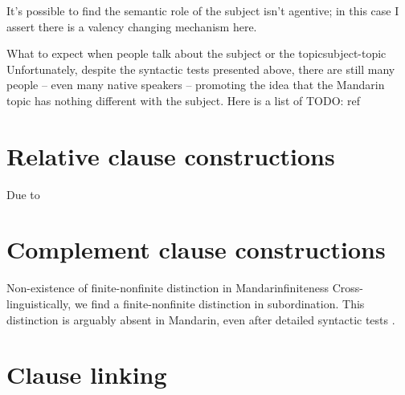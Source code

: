 \documentclass[UTF8, a4paper, oneside, scheme=plain]{ctexrep}
\begin{document}
It's possible to find the semantic role of the subject isn't agentive;
in this case I assert there is a valency changing mechanism here.

\begin{infobox}{What to expect when people talk about the subject or the topic}{subject-topic}
    Unfortunately, despite the syntactic tests presented above,
    there are still many people -- even many native speakers -- 
    promoting the idea that the Mandarin topic has nothing different with the subject.
    Here is a list of TODO: ref
\end{infobox}

\chapter{Relative clause constructions}

Due to 

\chapter{Complement clause constructions}\label{sec:complement-clause}


\begin{infobox}{Non-existence of finite-nonfinite distinction in Mandarin}{finiteness}
    Cross-linguistically, we find a finite-nonfinite distinction in subordination.
    This distinction is arguably absent in Mandarin,
    even after detailed syntactic tests \citep{no-finite}.
\end{infobox}

\chapter{Clause linking}\label{chap:clause-linking}



\end{document}
